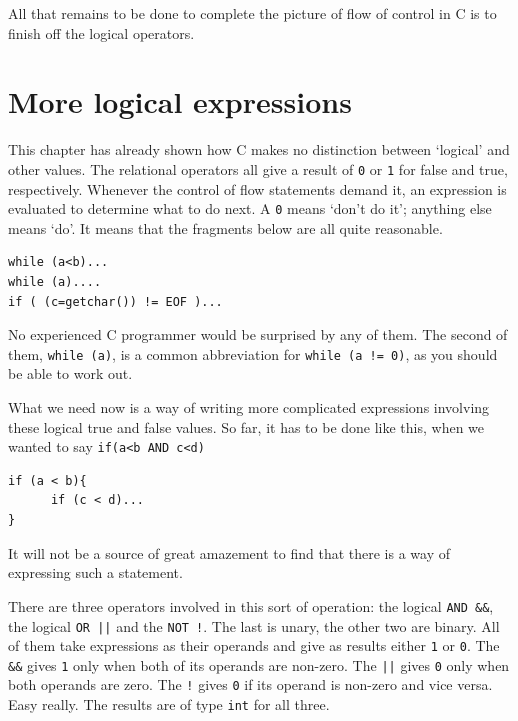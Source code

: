    All that remains to be done to complete the picture of flow of control
    in C is to finish off the logical operators.


  

 
        \section{More logical expressions}
        

  

  This chapter has already shown how C makes no distinction between
   `logical' and other values. The relational operators all give a
   result of \texttt{0} or \texttt{1} for false and true,
   respectively. Whenever the control of flow statements demand it, an
   expression is evaluated to determine what to do next. A \texttt{0}
   means `don't do it'; anything else means `do'. It means that
   the fragments below are all quite reasonable.


  \begin{Verbatim}
while (a<b)...
while (a)....
if ( (c=getchar()) != EOF )...
\end{Verbatim}

  No experienced C programmer would be surprised by any of them. The second
   of them, \texttt{while (a)}, is a common abbreviation for
   \texttt{while (a != 0)}, as you should be able to work
   out.


  What we need now is a way of writing more complicated expressions
   involving these logical true and false values. So far, it has to be done
   like this, when we wanted to say
   \texttt{if(a<b AND c<d)}


  \begin{Verbatim}
if (a < b){
      if (c < d)...
}
\end{Verbatim}

  It will not be a source of great amazement to find that there is a way of
   expressing such a statement.


  There are three operators involved in this sort of operation: the logical
   \texttt{AND \&\&}, the logical \texttt{OR ||} and
   the \texttt{NOT !}. The last is unary, the other two are binary.
   All of them take expressions as their operands and give as results
   either \texttt{1} or \texttt{0}.
   The \texttt{\&\&} gives \texttt{1} only when both
   of its operands are non-zero. The \texttt{||}
   gives \texttt{0} only when both operands are zero.
   The \texttt{!} gives \texttt{0} if its operand is
   non-zero and vice versa. Easy really. The results are of type
   \texttt{int} for all three.


